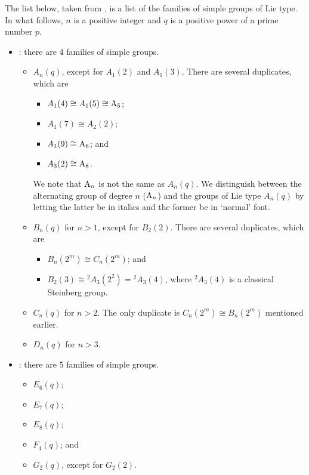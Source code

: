 The list below, taken from \cite{wikipedia_list-of-simple-groups}, is a list of the families of simple groups of Lie type. In what follows, $n$ is a positive integer and $q$ is a positive power of a prime number $p$.
\begin{itemize}
    \item {}: there are 4 families of simple groups.
    \begin{itemize}
        \item $A_n(q)$, except for $A_1(2)$ and $A_1(3)$. There are several duplicates, which are
        \begin{itemize}
            \item $A_1(4) \cong A_1(5) \cong \mathrm{A}_{5}$;
            \item $A_1(7) \cong A_2(2)$;
            \item $A_1(9) \cong \mathrm{A}_{6}$; and
            \item $A_3(2) \cong \mathrm{A}_{8}$.
        \end{itemize}
        We note that $\mathrm{A}_{n}$ is not the same as $A_n(q)$. We distinguish between the alternating group of degree $n$ ($\mathrm{A}_{n}$) and the groups of Lie type $A_n(q)$ by letting the latter be in italics and the former be in `normal' font.

        \item $B_n(q)$ for $n > 1$, except for $B_2(2)$. There are several duplicates, which are
        \begin{itemize}
            \item $B_n(2^m) \cong C_n(2^m)$; and
            \item $B_2(3) \cong {^2A_3(2^2)} = {^2A_3(4)}$, where ${^2A_3(4)}$ is a classical Steinberg group.
        \end{itemize}
        \item $C_n(q)$ for $n > 2$. The only duplicate is $C_n(2^m) \cong B_n(2^m)$ mentioned earlier.
        \item $D_n(q)$ for $n > 3$.
    \end{itemize}

    \item {}: there are 5 families of simple groups.
    \begin{itemize}
        \item $E_6(q)$;
        \item $E_7(q)$;
        \item $E_8(q)$;
        \item $F_4(q)$; and
        \item $G_2(q)$, except for $G_2(2)$.
    \end{itemize}


\end{itemize}
